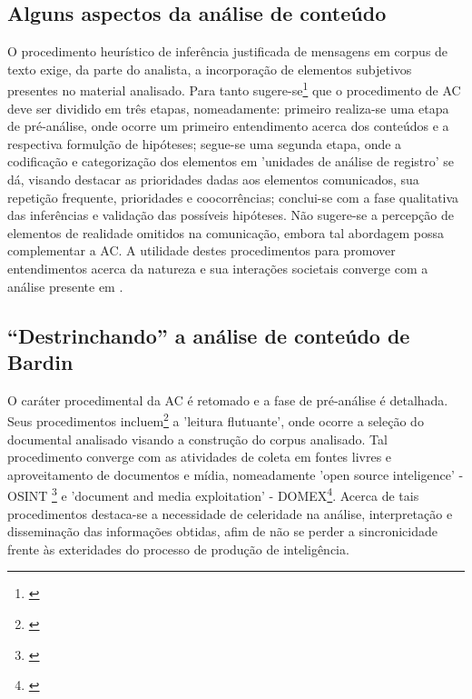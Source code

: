 \documentclass[
   article,       %
   12pt,          %
   oneside,       %
   a4paper,       %
   english,       %
   brazil,           %
   sumario=tradicional
   ]{abntex2}
\begin{document}
\subsection{Alguns aspectos da análise de conteúdo}

O procedimento heurístico de inferência justificada de mensagens em corpus de texto exige, da parte do analista, a incorporação de elementos subjetivos presentes no material analisado. Para tanto sugere-se\footnote{\cite[p.291]{bardin_epistemologia}} que o procedimento de AC deve ser dividido em três etapas, nomeadamente: primeiro realiza-se uma etapa de pré-análise, onde ocorre um primeiro entendimento acerca dos conteúdos e a respectiva formulção de hipóteses; segue-se uma segunda etapa, onde a codificação e categorização dos elementos em 'unidades de análise de registro' se dá, visando destacar as prioridades dadas aos elementos comunicados, sua repetição frequente, prioridades e coocorrências; conclui-se com a fase qualitativa das inferências e validação das possíveis hipóteses. Não sugere-se a percepção de elementos de realidade omitidos na comunicação, embora tal abordagem possa complementar a AC. A utilidade destes procedimentos para promover entendimentos acerca da natureza e sua interações societais converge com a análise presente em \cite[cap.4]{CIA_global_trends_2025}.


\subsection{“Destrinchando” a análise de conteúdo de Bardin}

O caráter procedimental da AC é retomado e a fase de pré-análise é detalhada. Seus procedimentos incluem\footnote{\cite[p.292]{bardin_epistemologia}} a 'leitura flutuante', onde ocorre a seleção do documental analisado visando a construção do corpus analisado. Tal procedimento converge com as atividades de coleta em fontes livres e aproveitamento de documentos e mídia, nomeadamente 'open source inteligence' - OSINT \footnote{\cite[1-23]{FM_2-0}} e 'document and media exploitation' - DOMEX\footnote{\cite[1-25]{FM_2-0}}. Acerca de tais procedimentos destaca-se a necessidade de celeridade na análise, interpretação e disseminação das informações obtidas, afim de não se perder a sincronicidade frente às exteridades do processo de produção de inteligência.
\end{document}
